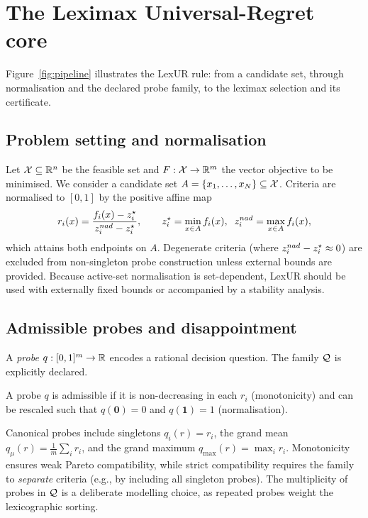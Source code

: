 \section{The Leximax Universal-Regret core}
\label{sec:core}

Figure~\ref{fig:pipeline} illustrates the LexUR rule: from a candidate set, through normalisation and the declared probe family, to the leximax selection and its certificate.



\subsection{Problem setting and normalisation}
Let $\mathcal{X}\subseteq\mathbb{R}^n$ be the feasible set and $F:\mathcal{X}\to\mathbb{R}^m$ the vector objective to be minimised. We consider a candidate set $A=\{x_1,\dots,x_N\}\subseteq\mathcal{X}$. Criteria are normalised to $[0,1]$ by the positive affine map
\begin{equation}
r_i(x)=\frac{f_i(x)-z^{\star}_i}{z^{nad}_i-z^{\star}_i},\qquad
z^{\star}_i=\min_{x\in A}f_i(x),\;\; z^{nad}_i=\max_{x\in A}f_i(x),
\label{eq:norm}
\end{equation}
which attains both endpoints on $A$. Degenerate criteria (where $z^{nad}_i-z^{\star}_i \approx 0$) are excluded from non-singleton probe construction unless external bounds are provided. Because active-set normalisation is set-dependent, LexUR should be used with externally fixed bounds or accompanied by a stability analysis.

\subsection{Admissible probes and disappointment}
A \emph{probe} $q:[0,1]^m\to\mathbb{R}$ encodes a rational decision question. The family $\mathcal{Q}$ is explicitly declared.

\begin{definition}
\label{def:probe}
A probe $q$ is admissible if it is non-decreasing in each $r_i$ (monotonicity) and can be rescaled such that $q(\mathbf 0)=0$ and $q(\mathbf 1)=1$ (normalisation).
\end{definition}

Canonical probes include singletons $q_i(r)=r_i$, the grand mean $q_\mu(r)=\frac1m\sum_i r_i$, and the grand maximum $q_{\max}(r)=\max_i r_i$. Monotonicity ensures weak Pareto compatibility, while strict compatibility requires the family to \emph{separate} criteria (e.g., by including all singleton probes). The multiplicity of probes in $\mathcal{Q}$ is a deliberate modelling choice, as repeated probes weight the lexicographic sorting.

